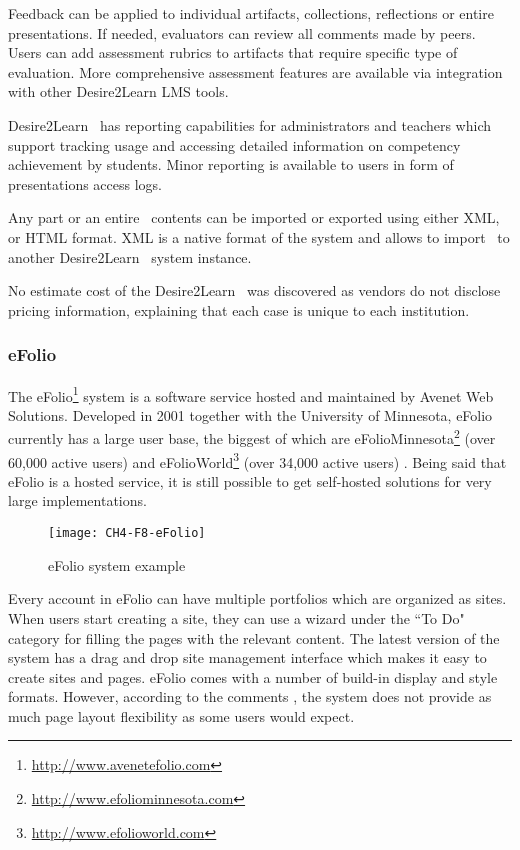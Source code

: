 Feedback can be applied to individual artifacts, collections, reflections or
entire presentations. If needed, evaluators can review all comments made by
peers. Users can add assessment rubrics to artifacts that require specific
type of evaluation. More comprehensive assessment features are available via
integration with other Desire2Learn LMS tools.

Desire2Learn \ep~has reporting capabilities for administrators and teachers which
support tracking usage and accessing detailed information on competency
achievement by students. Minor reporting is available to users in form of
presentations access logs.

Any part or an entire \ep~contents can be imported or exported using
either XML, or HTML format. XML is a native format of the system and allows to
import \ep~to another Desire2Learn \ep~system instance.

No estimate cost of the Desire2Learn \ep~was discovered as vendors do not
disclose pricing information, explaining that each case is unique to each
institution.
 
\subsubsection{eFolio}

The eFolio\footnote{\url{http://www.avenetefolio.com}} system is a software
service hosted and maintained by Avenet Web Solutions. Developed in 2001
together with the University of Minnesota, eFolio currently has a large user
base, the biggest of which are
eFolioMinnesota\footnote{\url{http://www.efoliominnesota.com}} (over 60,000
active users) and eFolioWorld\footnote{\url{http://www.efolioworld.com}} (over
34,000 active users) \citep{AAEEBL2011}. Being said that eFolio is a hosted
service, it is still possible to get self-hosted solutions for very large
implementations.

\begin{figure}[htb]
\centering
\setlength\fboxsep{0pt}
\setlength\fboxrule{0.5pt}
\texttt{[image: CH4-F8-eFolio]}
\caption[eFolio system example]{eFolio system example \citep{EFolioMinnesota2011}}
\label{fig:efolio}
\end{figure}

Every account in eFolio can have multiple portfolios which are organized as
sites. When users start creating a site, they can use a wizard under the ``To
Do" category for filling the pages with the relevant content. The latest version
of the system has a drag and drop site management interface which makes it easy to
create sites and pages. eFolio comes with a number of build-in display and style
formats. However, according to the comments \citep{AAEEBL2011}, the system
does not provide as much page layout flexibility as some users would expect.


